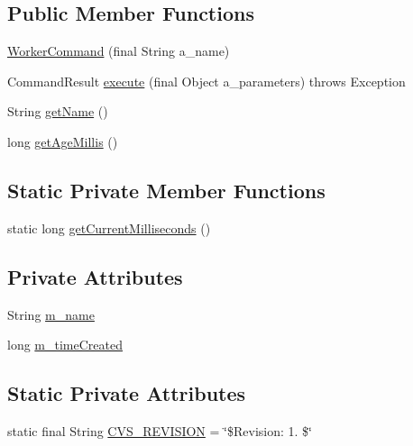 \subsection*{Public Member Functions}
\begin{DoxyCompactItemize}
\item 
\hyperlink{classorg_1_1jgap_1_1distr_1_1_worker_command_ad0cefc4f288e140d1087330ad48d7d2e}{Worker\-Command} (final String a\-\_\-name)
\item 
Command\-Result \hyperlink{classorg_1_1jgap_1_1distr_1_1_worker_command_a9b2e86e89542048dc457e6d0a7bd85bd}{execute} (final Object a\-\_\-parameters)  throws Exception 
\item 
String \hyperlink{classorg_1_1jgap_1_1distr_1_1_worker_command_a188f984bbdb9aacfaa643ef77277f734}{get\-Name} ()
\item 
long \hyperlink{classorg_1_1jgap_1_1distr_1_1_worker_command_a0c6cefa04e0ff28abf30ee4f22ced08c}{get\-Age\-Millis} ()
\end{DoxyCompactItemize}
\subsection*{Static Private Member Functions}
\begin{DoxyCompactItemize}
\item 
static long \hyperlink{classorg_1_1jgap_1_1distr_1_1_worker_command_a812c0236578b4a6d178ce5aa253afcd7}{get\-Current\-Milliseconds} ()
\end{DoxyCompactItemize}
\subsection*{Private Attributes}
\begin{DoxyCompactItemize}
\item 
String \hyperlink{classorg_1_1jgap_1_1distr_1_1_worker_command_a20aded8f8b9284d1d12d600251b9c023}{m\-\_\-name}
\item 
long \hyperlink{classorg_1_1jgap_1_1distr_1_1_worker_command_aa1595efb017c30d50dbb49a1d6932776}{m\-\_\-time\-Created}
\end{DoxyCompactItemize}
\subsection*{Static Private Attributes}
\begin{DoxyCompactItemize}
\item 
static final String \hyperlink{classorg_1_1jgap_1_1distr_1_1_worker_command_a9e60b27253d1b535742ac3d70c29f942}{C\-V\-S\-\_\-\-R\-E\-V\-I\-S\-I\-O\-N} = \char`\"{}\$Revision\-: 1. \$\char`\"{}
\end{DoxyCompactItemize}


